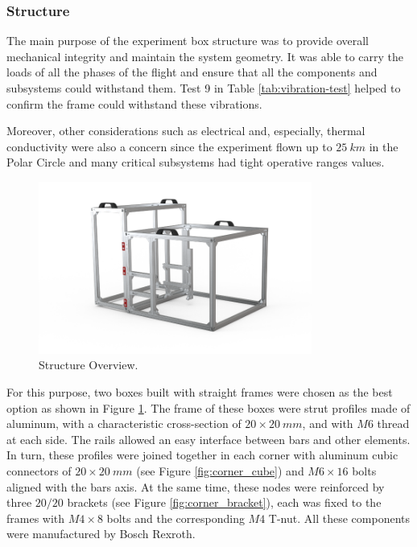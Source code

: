 \pagebreak
\subsubsection{Structure}
\label{sec:4.4.1}

The main purpose of the experiment box structure was to provide overall mechanical integrity and maintain the system geometry. It was able to carry the loads of all the phases of the flight and ensure that all the components and subsystems could withstand them. Test 9 in Table \ref{tab:vibration-test} helped to confirm the frame could withstand these vibrations.

Moreover, other considerations such as electrical and, especially, thermal conductivity were also a concern since the experiment flown up to $25\ km$ in the Polar Circle and many critical subsystems had tight operative ranges values.

 \begin{figure}[H]
     \centering
     \includegraphics[width=0.8\textwidth]{4-experiment-design/img/Mechanical/structure.png}
     \caption{Structure Overview.}
     \label{fig:structure}
\end{figure}

For this purpose, two boxes built with straight frames were chosen as the best option as shown in Figure \ref{fig:structure}. The frame of these boxes were strut profiles made of aluminum, with a characteristic cross-section of $20\times20\ mm$, and with $M6$ thread at each side. The rails allowed an easy interface between bars and other elements. In turn, these profiles were joined together in each corner with aluminum cubic connectors of $20\times20\ mm$ (see Figure \ref{fig:corner_cube}) and $M6\times16$ bolts aligned with the bars axis. At the same time, these nodes were reinforced by three $20/20$ brackets (see Figure \ref{fig:corner_bracket}), each was fixed to the frames with $M4\times8$ bolts and the corresponding $M4$ T-nut. All these components were manufactured by Bosch Rexroth.

